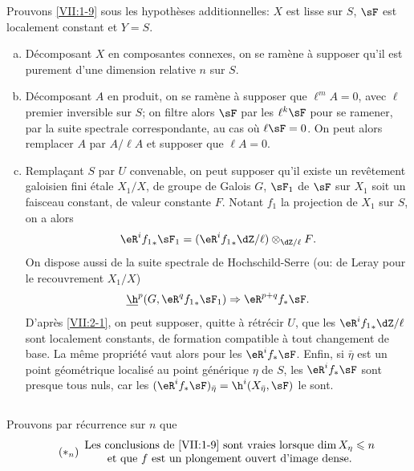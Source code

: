 Prouvons \ref{VII:1-9} sous les hypothèses additionnelles: $X$ est lisse sur 
$S$, $\sF$ est localement constant et $Y=S$. 
\begin{enumerate}[a)]
  \item Décomposant $X$ en composantes connexes, on se ramène à supposer 
    qu'il est purement d'une dimension relative $n$ sur $S$. 
  \item Décomposant $A$ en produit, on se ramène à supposer que 
    $\ell^m A=0$, avec $\ell$ premier inversible sur $S$; on filtre alors $\sF$ 
    par les $\ell^k \sF$ pour se ramener, par la suite spectrale 
    correspondante, au cas où $\ell\sF=0$. On peut alors remplacer $A$ par 
    $A/\ell A$ et supposer que $\ell A=0$. 
  \item {}Remplaçant $S$ par $U$ convenable, on peut supposer qu'il existe un 
    revêtement galoisien fini étale $X_1/X$, de groupe de Galois $G$,  $\sF_1$ de $\sF$ sur $X_1$ soit un faisceau 
    constant, de valeur constante $F$. Notant $f_1$ la projection de $X_1$ sur 
    $S$, on a alors 
    \[
      \eR^i {f_1}_\ast \sF_1 = (\eR^i {f_1}_\ast \dZ/\ell)\otimes_{\dZ/\ell} F \text{.} 
    \]
    On dispose aussi de la suite spectrale de Hochschild-Serre (ou: de Leray 
    pour le recouvrement $X_1/X$) 
    \[
      \underline\h^p(G,\eR^q {f_1}_\ast \sF_1) \Rightarrow \eR^{p+q} f_\ast \sF \text{.} 
    \]
    D'après \ref{VII:2-1}, on peut supposer, quitte à rétrécir $U$, que 
    les $\eR^i {f_1}_\ast \dZ/\ell$ sont localement constants, de formation 
    compatible à tout changement de base. La même propriété vaut alors 
    pour les $\eR^i f_\ast \sF$. Enfin, si $\bar\eta$ est un point 
    géométrique localisé au point générique $\eta$ de $S$, les 
    $\eR^i f_\ast\sF$ sont presque tous nuls, car les 
    $(\eR^i f_\ast \sF)_{\bar\eta} = \h^i(X_{\bar \eta},\sF)$ le sont. 
\end{enumerate}





\subsection{}\label{VII:2-3}

Prouvons par récurrence sur $n$ que 
\begin{equation*}\tag{$\ast_n$}\label{VII:eq:2-3-1}
  \begin{array}{c}
    \text{Les conclusions de \ref{VII:1-9} sont vraies lorsque $\dim{X_\eta}\leqslant n$} \\
    \text{et que $f$ est un plongement ouvert d'image dense.}
  \end{array}
\end{equation*}

